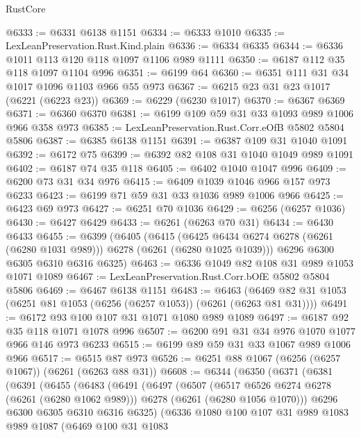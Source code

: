 \begin{lexlean}{RustCore}
\begin{coremodule}
@6333 := @6331 @6138 @1151
@6334 := @6333 @1010
@6335 := LexLeanPreservation.Rust.Kind.plain
@6336 := @6334 @6335
@6344 := @6336 @1011 @113 @120 @118 @1097 @1106 @989 @1111
@6350 := @6187 @112 @35 @118 @1097 @1104 @996
@6351 := @6199 @64
@6360 := @6351 @111 @31 @34 @1017 @1096 @1103 @966 @55 @973
@6367 := @6215 @23 @31 @23 @1017 (@6221 (@6223 @23))
@6369 := @6229 (@6230 @1017)
@6370 := @6367 @6369
@6371 := @6360 @6370
@6381 := @6199 @109 @59 @31 @33 @1093 @989 @1006 @966 @358 @973
@6385 := LexLeanPreservation.Rust.Corr.eOfB @5802 @5804 @5806
@6387 := @6385 @6138 @1151
@6391 := @6387 @109 @31 @1040 @1091
@6392 := @6172 @75
@6399 := @6392 @82 @108 @31 @1040 @1049 @989 @1091
@6402 := @6187 @74 @35 @118
@6405 := @6402 @1040 @1047 @996
@6409 := @6200 @73 @31 @34 @976
@6415 := @6409 @1039 @1046 @966 @157 @973 @6233
@6423 := @6199 @71 @59 @31 @33 @1036 @989 @1006 @966
@6425 := @6423 @69 @973
@6427 := @6251 @70 @1036
@6429 := @6256 (@6257 @1036)
@6430 := @6427 @6429
@6433 := @6261 (@6263 @70 @31)
@6434 := @6430 @6433
@6455 := @6399
    (@6405
      (@6415 (@6425 @6434 @6274 @6278 (@6261 (@6280 @1031 @989))) @6278 (@6261 (@6280 @1025 @1039)))
      @6296
      @6300
      @6305
      @6310
      @6316
      @6325)
@6463 := @6336 @1049 @82 @108 @31 @989 @1053 @1071 @1089
@6467 := LexLeanPreservation.Rust.Corr.bOfE @5802 @5804 @5806
@6469 := @6467 @6138 @1151
@6483 := @6463 (@6469 @82 @31 @1053 (@6251 @81 @1053 (@6256 (@6257 @1053)) (@6261 (@6263 @81 @31))))
@6491 := @6172 @93 @100 @107 @31 @1071 @1080 @989 @1089
@6497 := @6187 @92 @35 @118 @1071 @1078 @996
@6507 := @6200 @91 @31 @34 @976 @1070 @1077 @966 @146 @973 @6233
@6515 := @6199 @89 @59 @31 @33 @1067 @989 @1006 @966
@6517 := @6515 @87 @973
@6526 := @6251 @88 @1067 (@6256 (@6257 @1067)) (@6261 (@6263 @88 @31))
@6608 := @6344
    (@6350
      (@6371
        (@6381
          (@6391
            (@6455
              (@6483
                (@6491
                  (@6497
                    (@6507
                      (@6517 @6526 @6274 @6278 (@6261 (@6280 @1062 @989)))
                      @6278
                      (@6261 (@6280 @1056 @1070)))
                    @6296
                    @6300
                    @6305
                    @6310
                    @6316
                    @6325)
                  (@6336
                    @1080
                    @100
                    @107
                    @31
                    @989
                    @1083
                    @989
                    @1087
                    (@6469
                      @100
                      @31
                      @1083

\end{coremodule}
\end{lexlean}
